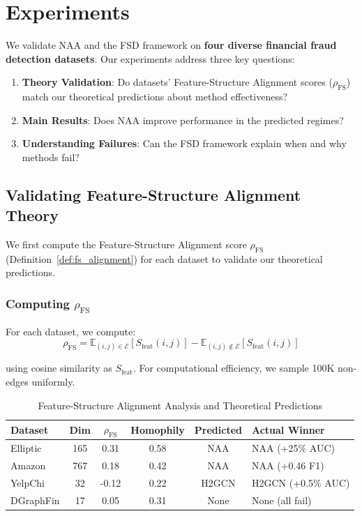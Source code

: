 
\section{Experiments}
\label{sec:experiments}

We validate NAA and the FSD framework on \textbf{four diverse financial fraud detection datasets}. Our experiments address three key questions:
\begin{enumerate}
    \item \textbf{Theory Validation}: Do datasets' Feature-Structure Alignment scores ($\rho_{\text{FS}}$) match our theoretical predictions about method effectiveness?
    \item \textbf{Main Results}: Does NAA improve performance in the predicted regimes?
    \item \textbf{Understanding Failures}: Can the FSD framework explain when and why methods fail?
\end{enumerate}

\subsection{Validating Feature-Structure Alignment Theory}
\label{sec:fs_validation}

We first compute the Feature-Structure Alignment score $\rho_{\text{FS}}$ (Definition~\ref{def:fs_alignment}) for each dataset to validate our theoretical predictions.

\subsubsection{Computing $\rho_{\text{FS}}$}

For each dataset, we compute:
\begin{equation}
\rho_{\text{FS}} = \mathbb{E}_{(i,j) \in \mathcal{E}}[S_{\text{feat}}(i, j)] - \mathbb{E}_{(i,j) \notin \mathcal{E}}[S_{\text{feat}}(i, j)]
\end{equation}

using cosine similarity as $S_{\text{feat}}$. For computational efficiency, we sample 100K non-edges uniformly.

\begin{table}[t]
\centering
\caption{Feature-Structure Alignment Analysis and Theoretical Predictions}
\label{tab:fs_alignment}
\small
\begin{tabular}{lccccl}
\toprule
\textbf{Dataset} & \textbf{Dim} & \textbf{$\rho_{\text{FS}}$} & \textbf{Homophily} & \textbf{Predicted} & \textbf{Actual Winner} \\
\midrule
Elliptic & 165 & 0.31 & 0.58 & NAA & NAA (+25\% AUC) \\
Amazon & 767 & 0.18 & 0.42 & NAA & NAA (+0.46 F1) \\
YelpChi & 32 & -0.12 & 0.22 & H2GCN & H2GCN (+0.5\% AUC) \\
DGraphFin & 17 & 0.05 & 0.31 & None & None (all fail) \\
\bottomrule
\end{tabular}
\end{table}

